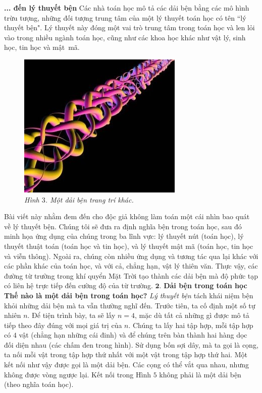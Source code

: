 \begin{multicols}{2}
\begin{figure}[H]
		\vspace*{-10pt}
	\end{figure}
	\textbf{\color{duongvaotoanhoc}... đến lý thuyết bện}
	\vskip 0.1cm
	Các nhà toán học mô tả các dải bện bằng các mô hình trừu tượng, những đối tượng trung tâm của một lý thuyết toán học có tên ``lý thuyết bện". Lý thuyết này đóng một vai trò trung tâm trong toán học và len lỏi vào trong nhiều ngành toán học, cũng như các khoa học khác như vật lý, sinh học, tin học và mật~mã.
	\begin{figure}[H]
		\vspace*{-5pt}
		\centering
		\captionsetup{labelformat= empty, justification=centering}
		\includegraphics[width= 0.65\linewidth]{fig_03a}
		\caption{\small\textit{\color{duongvaotoanhoc}Hình $3$. Một dải bện trang trí khác.}}
		\vspace*{-10pt}
	\end{figure}
	Bài viết này nhằm đem đến cho độc giả không làm toán một cái nhìn bao quát về lý thuyết bện. Chúng tôi sẽ đưa ra định nghĩa bện trong toán học, sau đó minh họa ứng dụng của chúng trong ba lĩnh vực: lý thuyết nút (toán học), lý thuyết thuật toán (toán học và tin học), và lý thuyết mật mã (toán học, tin học và viễn thông). Ngoài ra, chúng còn nhiều ứng dụng và tương tác qua lại khác với các phần khác của toán học, và với cả, chẳng hạn, vật lý thiên văn. Thực vậy, các đường từ trường trong khí quyển Mặt Trời tạo thành các dải bện mà độ phức tạp có liên hệ trực tiếp đến cường độ của từ trường.
	\vskip 0.1cm
	$\pmb{2.}$ \textbf{\color{duongvaotoanhoc}Dải bện trong toán học}
	\vskip 0.1cm
	\textbf{\color{duongvaotoanhoc}Thế nào là một dải bện trong toán học?}
	\vskip 0.1cm
	\textit{Lý thuyết bện} tách khái niệm bện khỏi những dải bện mà ta vẫn thường nghĩ đến. Trước tiên, ta cố định một số tự nhiên $n$. Để tiện trình bày, ta sẽ lấy $n = 4$, mặc dù tất cả những gì được mô tả tiếp theo đây đúng với mọi giá trị của $n$. Chúng ta lấy hai tập hợp, mỗi tập hợp có $4$ vật (chẳng hạn những cái đinh) và để chúng trên bàn thành hai hàng dọc đối diện nhau (các chấm đen trong hình). Sử dụng bốn sợi dây, mà ta gọi là cọng, ta nối mỗi vật trong tập hợp thứ nhất với một vật trong tập hợp thứ hai. Một kết nối như vậy được gọi là một dải bện. Các cọng có thể vắt qua nhau, nhưng không được vòng ngược lại. Kết nối trong Hình $5$ không phải là một dải bện (theo nghĩa toán học).

\end{multicols}
